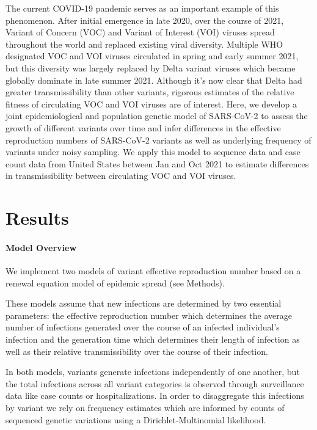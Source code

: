 \documentclass[11pt,oneside,letterpaper]{article}
\begin{document}
The current COVID-19 pandemic serves as an important example of this phenomenon.
After initial emergence in late 2020, over the course of 2021, Variant of Concern (VOC) and Variant of Interest (VOI) viruses spread throughout the world and replaced existing viral diversity.
Multiple WHO designated \cite{Konings2021} VOC and VOI viruses circulated in spring and early summer 2021, but this diversity was largely replaced by Delta variant viruses which became globally dominate in late summer 2021.
Although it's now clear that Delta had greater transmissibility than other variants, rigorous estimates of the relative fitness of circulating VOC and VOI viruses are of interest.
Here, we develop a joint epidemiological and population genetic model of SARS-CoV-2 to assess the growth of different variants over time and infer differences in the effective reproduction numbers of SARS-CoV-2 variants as well as underlying frequency of variants under noisy sampling.
We apply this model to sequence data and case count data from United States between Jan and Oct 2021 to estimate differences in transmissibility between circulating VOC and VOI viruses.

\section*{Results}

\paragraph{Model Overview}%

We implement two models of variant effective reproduction number based on a renewal equation model of epidemic spread (see Methods).

These models assume that new infections are determined by two essential parameters: the effective reproduction number which determines the average number of infections generated over the course of an infected individual's infection and the generation time which determines their length of infection as well as their relative transmissibility over the course of their infection.

In both models, variants generate infections independently of one another, but the total infections across all variant categories is observed through surveillance data like case counts or hospitalizations. In order to disaggregate this infections by variant we rely on frequency estimates which are informed by counts of sequenced genetic variations using a Dirichlet-Multinomial likelihood.
\end{document}
